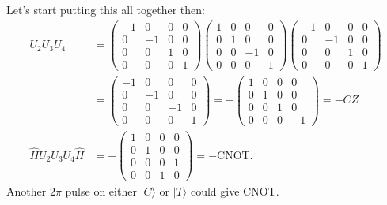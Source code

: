 \documentclass[a4paper, 11pt, normalem]{report}
\begin{document}
Let's start putting this all together then:
\begin{align}
    U_2U_3U_4 &= \begin{pmatrix} -1 & 0 & 0 & 0 \\ 0 & -1 & 0 & 0 \\ 0 & 0 & 1 & 0 \\ 0 & 0 & 0 & 1 \end{pmatrix} \begin{pmatrix} 1 & 0 & 0 & 0 \\ 0 & 1 & 0 & 0 \\ 0 & 0 & -1 & 0 \\ 0 & 0 & 0 & 1\end{pmatrix} \begin{pmatrix} -1 & 0 & 0 & 0 \\ 0 & -1 & 0 & 0 \\ 0 & 0 & 1 & 0 \\ 0 & 0 & 0 & 1 \end{pmatrix}\\
              &= \begin{pmatrix} -1 & 0 & 0 & 0 \\ 0 & -1 & 0 & 0 \\ 0 & 0 & -1 & 0 \\ 0 & 0 & 0 & 1 \end{pmatrix} = -\begin{pmatrix} 1 & 0 & 0 & 0 \\ 0 & 1 & 0 & 0 \\ 0 & 0 & 1 & 0 \\ 0 & 0 & 0 & -1 \end{pmatrix} = -CZ \\
    \hat{H}U_2U_3U_4\hat{H} &= -\begin{pmatrix} 1 & 0 & 0 & 0 \\ 0 & 1 & 0 & 0 \\ 0 & 0 & 0 & 1 \\ 0 & 0 & 1 & 0 \end{pmatrix} = -\text{CNOT}.
\end{align}
Another $2\pi$ pulse on either $|C\rangle$ or $|T\rangle$ could give CNOT.
\end{document}
